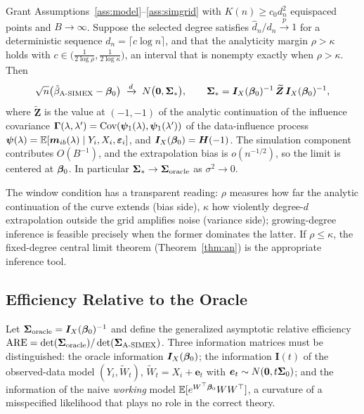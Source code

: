 \begin{theorem}\label{thm:grow}
Grant Assumptions~\ref{ass:model}--\ref{ass:simgrid} with
$K(n)\ge c_0d_n^2$ equispaced points and $B\to\infty$. Suppose the
selected degree satisfies $\hat d_n/d_n\xrightarrow{p}1$ for a
deterministic sequence $d_n=\lceil c\log n\rceil$, and that the
analyticity margin $\rho>\kappa$ holds with
$c\in\bigl(\tfrac{1}{2\log\rho},\tfrac{1}{2\log\kappa}\bigr)$, an
interval that is nonempty exactly when $\rho>\kappa$. Then
\[
  \sqrt n\bigl(\hat\beta_{\textup{A-SIMEX}}-\bm{\beta}_0\bigr)
  \;\xrightarrow{d}\;N\bigl(\bm 0,\bm{\Sigma}_*\bigr),
  \qquad
  \bm{\Sigma}_*=\bm I_X(\bm{\beta}_0)^{-1}\,\widetilde{\bm Z}\,
           \bm I_X(\bm{\beta}_0)^{-1},
\]
where $\widetilde{\bm Z}$ is the value at $(-1,-1)$ of the analytic
continuation of the influence covariance
$\bm\Gamma(\lambda,\lambda')
=\mathrm{Cov}(\bm\psi_1(\lambda),\bm\psi_1(\lambda'))$ of the data-influence
process $\bm\psi(\lambda)=\mathbb{E}[\bm m_{ib}(\lambda)\mid Y_i,X_i,\bm{\varepsilon}_i]$,
and $\bm I_X(\bm{\beta}_0)=\bm{H}(-1)$. The simulation component contributes
$O(B^{-1})$, and the extrapolation bias is $o(n^{-1/2})$, so the limit
is centered at $\bm{\beta}_0$. In particular
$\bm{\Sigma}_*\to\bm{\Sigma}_{\mathrm{oracle}}$ as $\sigma^2\to0$.
\end{theorem}

The window condition has a transparent reading: $\rho$ measures how
far the analytic continuation of the curve extends (bias side),
$\kappa$ how violently degree-$d$ extrapolation outside the grid
amplifies noise (variance side); growing-degree inference is feasible
precisely when the former dominates the latter. If $\rho\le\kappa$,
the fixed-degree central limit theorem (Theorem~\ref{thm:an}) is the
appropriate inference tool.

\subsection{Efficiency Relative to the Oracle}\label{sec:are}

Let $\bm{\Sigma}_{\mathrm{oracle}}=\bm I_X(\bm{\beta}_0)^{-1}$ and define the
generalized asymptotic relative efficiency
$\mathrm{ARE}=\det(\bm{\Sigma}_{\mathrm{oracle}})/
\det(\bm{\Sigma}_{\textup{A-SIMEX}})$. Three information matrices must be
distinguished: the oracle information $\bm I_X(\bm{\beta}_0)$; the
information $\bm I(t)$ of the observed-data model
$(Y_i,\widetilde W_t)$, $\widetilde W_t=X_i+\bm e_t$ with
$\bm e_t\sim N(\bm 0,t\bm{\Sigma}_0)$; and the information of the naive
\emph{working} model $\mathbb{E}[e^{W^\top\bm{\beta}_0}WW^\top]$, a curvature of a
misspecified likelihood that plays no role in the correct theory.

